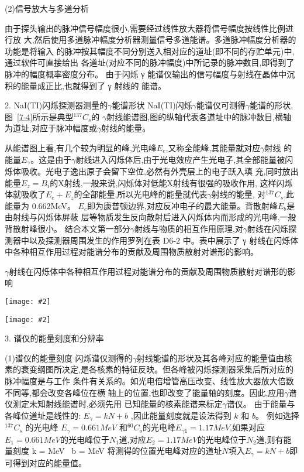 \documentclass[11pt,a4paper]{ctexart}
\newcommand{\cpic}[2]{
\begin{center}
\texttt{[image: \#2]}
\end{center}
}
\begin{document}
(2)信号放大与多道分析

由于探头输出的脉冲信号幅度很小,需要经过线性放大器将信号幅度按线性比例进行放
大,然后使用多道脉冲幅度分析器测量信号多道能谱。多道脉冲幅度分析器的功能是将输入
的脉冲按其幅度不同分别送入相对应的道址(即不同的存贮单元)中,通过软件可直接给出
各道址(对应不同的脉冲幅度)中所记录的脉冲数目,即得到了脉冲的幅度概率密度分布。
由于闪烁 γ 能谱仪输出的信号幅度与射线在晶体中沉积的能量成正比,也就得到了 γ 射线的
能谱。

2. NaI(TI)闪烁探测器测量的$\gamma$能谱形状
NaI(TI)闪烁$\gamma$能谱仪可测得$\gamma$能谱的形状,图~\ref{7-4}所示是典型$^{137}C_s$的 $\gamma$射线能谱图,图的纵轴代表各道址中的脉冲数目,横轴为道址,对应于脉冲幅度或$\gamma$射线的能量。

从能谱图上看,有几个较为明显的峰,光电峰$E_e$,又称全能峰,其能量就对应$\gamma$射线
的能量$E_\gamma$。这是由于$\gamma$射线进入闪烁体后,由于光电效应产生光电子,其全部能量被闪烁体吸收。光电子逸出原子会留下空位,必然有外壳层上的电子跃入填
充,同时放出能量$E_z = B_i$的X射线,一般来说,闪烁体对低能X射线有很强的吸收作用,
这样闪烁体就吸收了$E_e+E_z$的全部能量,所以光电峰的能量就代表$\gamma$射线的能量,
对$^{137}C_s$,此能量为 0.662MeV。
$E_c$即为康普顿边界,对应反冲电子的最大能量。背散射峰$E_b$是由射线与闪烁体屏蔽
层等物质发生反向散射后进入闪烁体内而形成的光电峰,一般背散射峰很小。
结合本文第一部分$\gamma$射线与物质的相互作用原理,对$\gamma$射线在闪烁探测器中以及探测器周围发生的作用罗列在表 D6-2 中。表中展示了 γ 射线在闪烁体中各种相互作用过程对能谱分布的贡献及周围物质散射对谱形的影响。
\begin{table}[H]\label{6-2}
  \caption{$\gamma$射线在闪烁体中各种相互作用过程对能谱分布的贡献及周围物质散射对谱形的影响}
  \cpic{0.4}{6-2-1}
  \cpic{0.4}{6-2-2}
\end{table}

3. 谱仪的能量刻度和分辨率

(1)谱仪的能量刻度
闪烁谱仪测得的$\gamma$射线能谱的形状及其各峰对应的能量值由核素的衰变纲图所决定,是各核素的特征反映。但各峰被闪烁探测器采集后所对应的脉冲幅度是与工作
条件有关系的。如光电倍增管高压改变、线性放大器放大倍数不同等,都会改变各峰位在横
轴上的位置,也即改变了能量轴的刻度。因此,应用$\gamma$谱仪测定未知射线能谱时,必须先用
已知能量的核素能谱来标定$\gamma$谱仪。
由于能量与各峰位道址是线性的: $E_\gamma = kN+b$ ,因此能量刻度就是设法得到 $k$ 和 $b$。
例如选择$^{137}C_s$ 的光电峰 $E_\gamma =0.661 MeV$ 和$^{60}C_o$的光电峰$E_{\gamma 1}=1.17MeV$,如果对应$E_1=0.661 MeV$的光电峰位于$N_1$道,对应$E_2 = 1.17MeV$的光电峰位于$N_2$道,则有能量刻度
\beq
k =  MeV \,\,\,b = MeV
\eeq
将测得的位置光电峰对应的道址$N$填入$E_\gamma = kN+b$即可得到对应的能量值。
\end{document}
